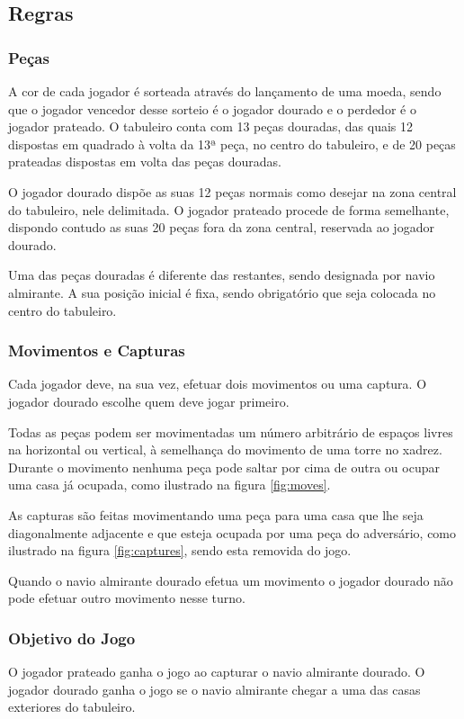 \documentclass[a4paper]{article}
\begin{document}
\subsection{Regras}
\subsubsection{Peças}
A cor de cada jogador é sorteada através do lançamento de uma moeda, sendo que o jogador vencedor desse sorteio é o jogador dourado e o perdedor é o jogador prateado. O tabuleiro conta com 13 peças douradas, das quais 12 dispostas em quadrado à volta da 13ª peça, no centro do tabuleiro, e de 20 peças prateadas dispostas em volta das peças douradas.

O jogador dourado dispõe as suas 12 peças normais como desejar na zona central do tabuleiro, nele delimitada. O jogador prateado procede de forma semelhante, dispondo contudo as suas 20 peças fora da zona central, reservada ao jogador dourado.

Uma das peças douradas é diferente das restantes, sendo designada por navio almirante. A sua posição inicial é fixa, sendo obrigatório que seja colocada no centro do tabuleiro.

\subsubsection{Movimentos e Capturas}
Cada jogador deve, na sua vez, efetuar dois movimentos ou uma captura. O jogador dourado escolhe quem deve jogar primeiro.

Todas as peças podem ser movimentadas um número arbitrário de espaços livres na horizontal ou vertical, à semelhança do movimento de uma torre no xadrez. Durante o movimento nenhuma peça pode saltar por cima de outra ou ocupar uma casa já ocupada, como ilustrado na figura \ref{fig:moves}.

As capturas são feitas movimentando uma peça para uma casa que lhe seja diagonalmente adjacente e que esteja ocupada por uma peça do adversário, como ilustrado na figura \ref{fig:captures}, sendo esta removida do jogo.

Quando o navio almirante dourado efetua um movimento o jogador dourado não pode efetuar outro movimento nesse turno.

\subsubsection{Objetivo do Jogo}
O jogador prateado ganha o jogo ao capturar o navio almirante dourado. O jogador dourado ganha o jogo se o navio almirante chegar a uma das casas exteriores do tabuleiro.
\end{document}
